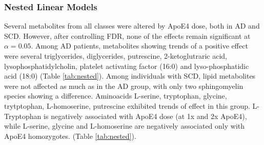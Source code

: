 \documentclass{amsart}
\begin{document}
\subsubsection{Nested Linear Models}
Several metabolites from all classes were altered by ApoE4 dose, both in AD and SCD. However, after controlling FDR, none of the effects remain significant at $\alpha=0.05$. Among AD patients, metabolites showing trends of a positive effect were several triglycerides, diglycerides, putrescine, 2-ketoglutraric acid, lysophosphatidylcholin, platelet activating factor (16:0) and lyso-phosphatidic acid (18:0) (Table \ref{tab:nested}). Among individuals with SCD, lipid metabolites were not affected as much as in the AD group, with only two sphingomyelin species showing a difference. Aminoacids L-serine, tryptophan, glycine, trytptophan, L-homoserine, putrescine exhibited trends of effect in this group. L-Tryptophan is negatively associated with ApoE4 dose (at 1x and 2x ApoE4), while L-serine, glycine and L-homoserine are negatively associated only with ApoE4 homozygotes. (Table \ref{tab:nested}). 
\end{document}

